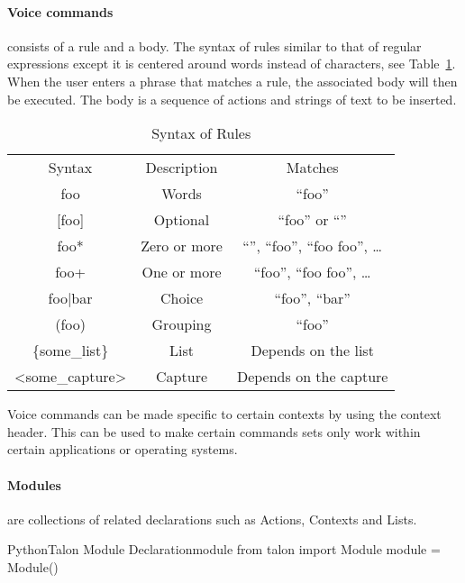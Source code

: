 \documentclass[../thesis.tex]{subfiles}
\begin{document}
\paragraph{Voice commands}
consists of a rule and a body.
The syntax of rules similar to that of regular expressions except it is centered around words instead of characters, see  Table~\ref{tab:rules}.
When the user enters a phrase that matches a rule, the associated body will then be executed.
The body is a sequence of actions and strings of text to be inserted.

\begin{table}[htpb]
    \centering
    \begin{tabular}{c|c|c}
        Syntax &	Description &	Matches\\
        foo &	Words &	``foo''\\
        {[foo]} &	Optional &	``foo'' or ``''\\
        foo* &	Zero or more &	``'', ``foo'', ``foo foo'', …\\
        foo+ &	One or more &	“foo”, “foo foo”, …\\
        foo|bar &	Choice &	“foo”, “bar”\\
        (foo) &	Grouping &	“foo”\\
        \{some\_list\} &	List &	Depends on the list\\
        <some\_capture> &	Capture &	Depends on the capture
    \end{tabular}
    \caption{Syntax of Rules}
    \label{tab:rules}
\end{table}
Voice commands can be made specific to certain contexts by using the context header.
This can be used to make certain commands sets only work within certain applications or operating systems. 

\paragraph{Modules}
are collections of related declarations such as Actions, Contexts and Lists.
\begin{code}{Python}{Talon Module Declaration}{module}
from talon import Module
module = Module()
\end{code}
\end{document}
